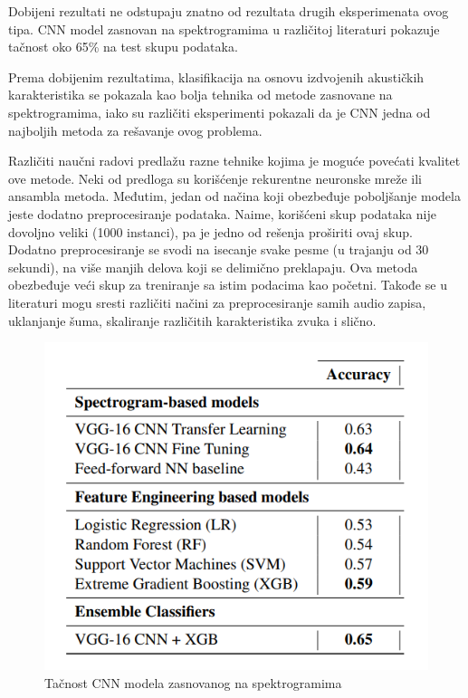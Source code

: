\documentclass{article}
\begin{document}
Dobijeni rezultati ne odstupaju znatno od rezultata drugih eksperimenata ovog tipa. CNN model zasnovan na spektrogramima u različitoj literaturi pokazuje tačnost oko 65\% na test skupu podataka. 

Prema dobijenim rezultatima, klasifikacija na osnovu izdvojenih akustičkih karakteristika se pokazala kao bolja tehnika od metode zasnovane na spektrogramima, iako su različiti eksperimenti pokazali da je CNN jedna od najboljih metoda za rešavanje ovog problema.

Različiti naučni radovi predlažu razne tehnike kojima je moguće povećati kvalitet ove metode. Neki od predloga su korišćenje rekurentne neuronske mreže ili ansambla metoda. Međutim, jedan od načina koji obezbeđuje poboljšanje modela jeste dodatno preprocesiranje podataka. Naime, korišćeni skup podataka nije dovoljno veliki (1000 instanci), pa je jedno od rešenja proširiti ovaj skup. Dodatno preprocesiranje se svodi na isecanje svake pesme (u trajanju od 30 sekundi), na više manjih delova koji se delimično preklapaju. Ova metoda obezbeđuje veći skup za treniranje sa istim podacima kao početni. Takođe se u literaturi mogu sresti različiti načini za preprocesiranje samih audio zapisa, uklanjanje šuma, skaliranje različitih karakteristika zvuka i slično.

\begin{figure}[h]
\centering
\includegraphics[scale=0.8]{acc}
\caption{Tačnost CNN modela zasnovanog na spektrogramima \cite{MLT-ACC}}
\end{figure}
\end{document}
